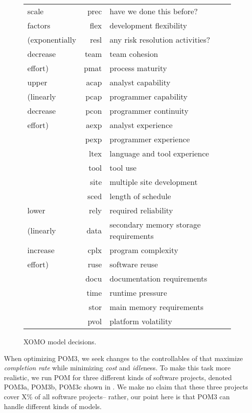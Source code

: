 \begin{wrapfigure}{r}{2in}
{\scriptsize
\begin{tabular}{l|r@{:~}p{1.2in}|}\cline{2-3}
scale   &prec & have we done this before?\\
factors &flex & development flexibility \\
(exponentially        &resl & any risk resolution activities?\\
 decrease       &team &  team cohesion\\
 effort)       &pmat & process maturity\\\hline
upper  &acap & analyst capability\\
(linearly       &pcap & programmer capability\\
 decrease      &pcon & programmer continuity\\
effort)       &aexp &  analyst experience\\
       &pexp &  programmer experience\\
       &ltex &  language and tool experience\\
       &tool &  tool use\\
       &site &  multiple site development\\
       &sced & length of schedule   \\\hline
lower &rely &    required reliability  \\
(linearly      &data &   secondary memory  storage requirements\\
increase      &cplx &  program complexity\\
effort)      &ruse &  software reuse\\
      &docu &   documentation requirements\\
      &time &   runtime pressure\\
      &stor &   main memory requirements\\
     &pvol &    platform volatility  \\\cline{2-3}
\end{tabular}}
\caption{
XOMO model decisions.}\label{fig:emsf2}
\end{wrapfigure}
When optimizing POM3, we seek 
changes to the controllables of  that maximize {\em completion rate}
while minimizing  {\em cost} and {\em idle}ness. 
To make this task more realistic, we run POM
for three different kinds of software projects, denoted POM3a, POM3b, POM3c
shown in . We make no claim that these three projects cover X\% of all
software projects-- rather, our point here is that POM3 can handle different kinds of models.



